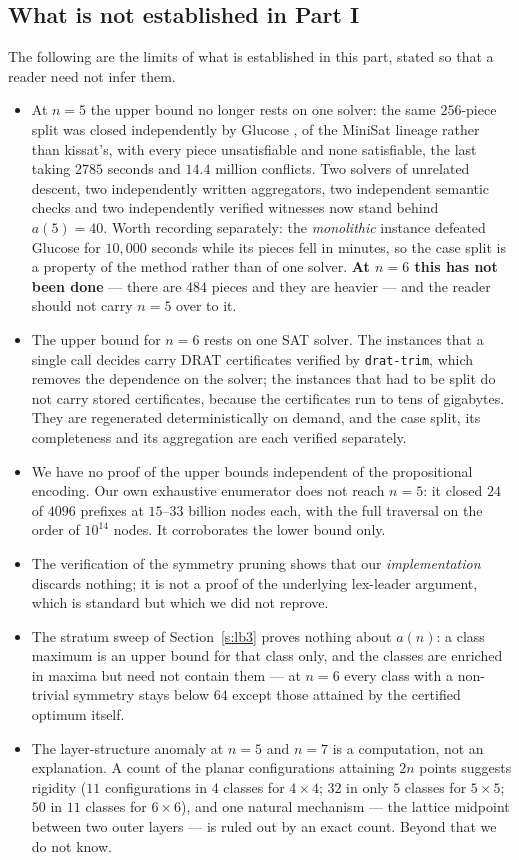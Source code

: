 \documentclass[11pt,a4paper]{article}
\begin{document}
\subsection{What is not established in Part I}\label{s:notest3}
The following are the limits of what is established in this part, stated so that a reader need not infer them.
\begin{itemize}\itemsep2pt
\item At $n=5$ the upper bound no longer rests on one solver: the same $256$-piece split was closed
independently by Glucose \cite{Glucose}, of the MiniSat lineage rather than kissat's, with every piece unsatisfiable and none
satisfiable, the last taking $2785$ seconds and $14.4$ million conflicts.  Two solvers of unrelated descent, two
independently written aggregators, two independent semantic checks and two independently verified witnesses now
stand behind $a(5)=40$.  Worth recording separately: the \emph{monolithic} instance defeated Glucose for
$10{,}000$ seconds while its pieces fell in minutes, so the case split is a property of the method rather than
of one solver.  \textbf{At $n=6$ this has not been done} --- there are $484$ pieces and they are heavier --- and
the reader should not carry $n=5$ over to it.
\item The upper bound for $n=6$ rests on one SAT solver.  The instances that a single call decides carry
DRAT certificates verified by \texttt{drat-trim}, which removes the dependence on the solver; the instances
that had to be split do not carry stored certificates, because the certificates run to tens of gigabytes.
They are regenerated deterministically on demand, and the case split, its completeness and its aggregation are
each verified separately.
\item We have no proof of the upper bounds independent of the propositional encoding.  Our own exhaustive
enumerator does not reach $n=5$: it closed $24$ of $4096$ prefixes at $15$--$33$ billion nodes each, with the
full traversal on the order of $10^{14}$ nodes.  It corroborates the lower bound only.
\item The verification of the symmetry pruning shows that our \emph{implementation} discards nothing; it is
not a proof of the underlying lex-leader argument, which is standard but which we did not reprove.
\item The stratum sweep of Section~\ref{s:lb3} proves nothing about $a(n)$: a class maximum is an upper bound for that
class only, and the classes are enriched in maxima but need not contain them --- at $n=6$ every class with a
non-trivial symmetry stays below $64$ except those attained by the certified optimum itself.
\item The layer-structure anomaly at $n=5$ and $n=7$ is a computation, not an explanation.  A count of the
planar configurations attaining $2n$ points suggests rigidity ($11$ configurations in $4$ classes for
$4\times4$; $32$ in only $5$ classes for $5\times5$; $50$ in $11$ classes for $6\times6$), and one natural
mechanism --- the lattice midpoint between two outer layers --- is ruled out by an exact count.  Beyond that we
do not know.
\end{itemize}
\end{document}
